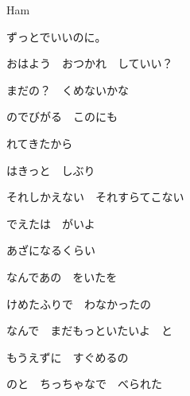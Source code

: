 \documentclass[a4paper,tate,twocolumn,12pt]{ltjtarticle}
\begin{document}
\thispagestyle{empty}

\begin{center}
{\LARGE Ham}

{\large ずっとでいいのに。}
\end{center}

\vspace{1em}

\begin{flushleft}

\noindent\begin{minipage}{\linewidth}
おはよう　おつかれ　していい？

まだの？　くめないかな

のでびがる　このにも

れてきたから
\end{minipage}

\vspace{2em}

\noindent\begin{minipage}{\linewidth}
はきっと　しぶり

それしかえない　それすらてこない

でえたは　がいよ

あざになるくらい
\end{minipage}

\vspace{2em}

\noindent\begin{minipage}{\linewidth}
なんであの　をいたを

けめたふりで　わなかったの

なんで　まだもっといたいよ　と

もうえずに　すぐめるの
\end{minipage}

\vspace{2em}

\noindent\begin{minipage}{\linewidth}
のと　ちっちゃなで　べられた


\end{minipage}
\end{flushleft}
\end{document}
